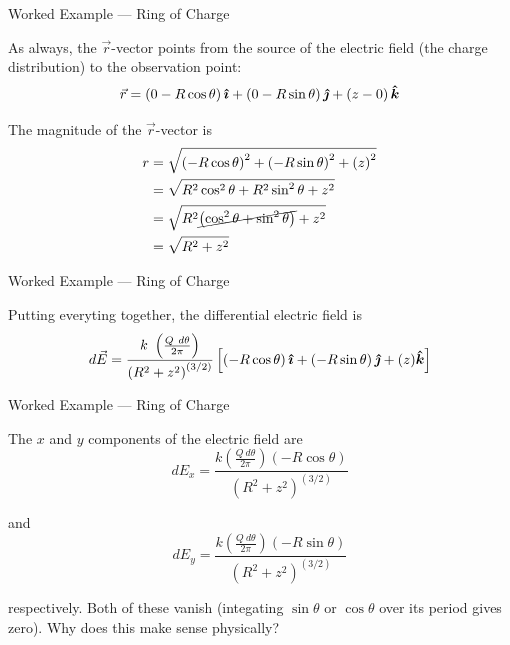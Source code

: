 \documentclass{beamer}
\begin{document}
\begin{frame}{Worked Example --- Ring of Charge}

As always, the $\vec{r}$-vector points from the source of the electric field (the charge distribution) to the observation point:
\begin{equation*}
    \vec{r} = \left( 0 - R\cos{\theta} \right) \bm{\hat{\imath}} + \left( 0 - R\sin{\theta} \right) \bm{\hat{\jmath}} + \left( z - 0 \right) \bm{\hat{k}}
\end{equation*}

The magnitude of the $\vec{r}$-vector is
\begin{align*}
    r &= \sqrt{ \left( -R\cos{\theta} \right)^2 + \left( -R\sin{\theta} \right)^2 + \left( z \right)^2 } \\
      &= \sqrt{R^2 \cos^{2}{\theta} + R^2 \sin^{2}{\theta} + z^2} \\
      &= \sqrt{ R^2 \cancel{ \left( \cos^2{\theta} + \sin^2{\theta} \right) } + z^2 } \\
      &= \sqrt{R^2 + z^2}
\end{align*}

\end{frame}

\begin{frame}{Worked Example --- Ring of Charge}

Putting everyting together, the differential electric field is
\begin{equation*}
    d\vec{E} = \frac{k\ \left( \frac{Q\ d\theta}{2\pi} \right)}{\left( R^2 + z^2 \right)^{(3/2)}} \left[ \left( -R\cos{\theta} \right) \ihat + \left( -R\sin{\theta} \right) \jhat + (z) \khat \right]
\end{equation*}

\end{frame}

\begin{frame}{Worked Example --- Ring of Charge}

The $x$ and $y$ components of the electric field are
\begin{equation*}
    dE_x = \frac{k \left( \frac{Q\ d\theta}{2\pi} \right) \left( -R\cos{\theta} \right)}{\left( R^2 + z^2 \right)^{(3/2)}}
\end{equation*}

and
\begin{equation*}
    dE_y = \frac{k \left( \frac{Q\ d\theta}{2\pi} \right) \left( -R\sin{\theta} \right)}{\left( R^2 + z^2 \right)^{(3/2)}}
\end{equation*}

respectively. Both of these vanish (integating $\sin{\theta}$ or $\cos{\theta}$ over its period gives zero). Why does this make sense physically?

\end{frame}
\end{document}
